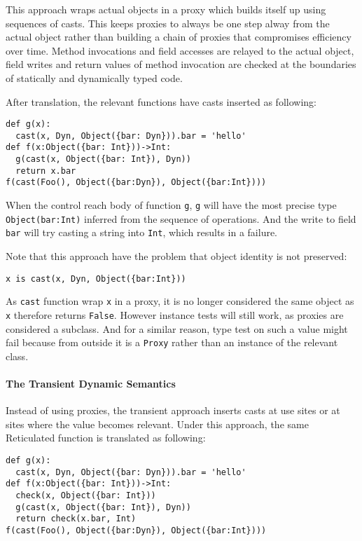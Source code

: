 This approach wraps actual objects in a proxy which builds itself up using sequences of casts.
This keeps proxies to always be one step alway from the actual object rather than building
a chain of proxies that compromises efficiency over time.
Method invocations and field accesses are relayed to the actual object,
field writes and return values of method invocation are checked at the boundaries
of statically and dynamically typed code.

After translation, the relevant functions have casts inserted as following:

\begin{verbatim}
def g(x):
  cast(x, Dyn, Object({bar: Dyn})).bar = 'hello'
def f(x:Object({bar: Int}))->Int:
  g(cast(x, Object({bar: Int}), Dyn))
  return x.bar
f(cast(Foo(), Object({bar:Dyn}), Object({bar:Int})))
\end{verbatim}

When the control reach body of function \texttt{g},
\texttt{g} will have the most precise type \texttt{Object({bar:Int})} inferred from the sequence
of operations. And the write to field \texttt{bar} will try casting a string into \texttt{Int},
which results in a failure.

Note that this approach have the problem that object identity is not preserved:

\begin{verbatim}
x is cast(x, Dyn, Object({bar:Int}))
\end{verbatim}

As \texttt{cast} function wrap \texttt{x} in a proxy, it is no longer considered the same object as \texttt{x}
therefore returns \texttt{False}. However instance tests will still work, as proxies are considered a subclass.
And for a similar reason, type test on such a value might fail because from outside it is a \texttt{Proxy}
rather than an instance of the relevant class.

\paragraph{The Transient Dynamic Semantics}

Instead of using proxies, the transient approach inserts casts at use sites or at sites where
the value becomes relevant. Under this approach, the same Reticulated function is translated as following:

\begin{verbatim}
def g(x):
  cast(x, Dyn, Object({bar: Dyn})).bar = 'hello'
def f(x:Object({bar: Int}))->Int:
  check(x, Object({bar: Int}))
  g(cast(x, Object({bar: Int}), Dyn))
  return check(x.bar, Int)
f(cast(Foo(), Object({bar:Dyn}), Object({bar:Int})))
\end{verbatim}

